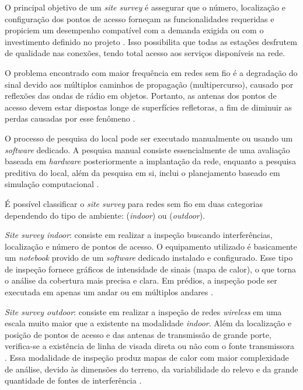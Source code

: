 O principal objetivo de um \textit{site survey} é assegurar que o número, localização e configuração dos pontos de acesso forneçam as funcionalidades requeridas e propiciem um desempenho compatível com a demanda exigida ou com o investimento definido no projeto \cite{pinheiro2004site}. Isso possibilita que todas as estações desfrutem de qualidade nas conexões, tendo total acesso aos serviços disponíveis na rede.

O problema encontrado com maior frequência em redes sem fio é a degradação do sinal devido aos múltiplos caminhos de propagação (multipercurso), causado por reflexões das ondas de rádio em objetos. Portanto, as antenas dos pontos de acesso devem estar dispostas longe de superfícies refletoras, a fim de diminuir as perdas causadas por esse fenômeno \cite{kar2018ieee}.

O processo de pesquisa do local pode ser executado manualmente ou usando um \textit{software} dedicado. A pesquisa manual consiste essencialmente de uma avaliação baseada em \textit{hardware} posteriormente a implantação da rede, enquanto a pesquisa preditiva do local, além da pesquisa em si, inclui o planejamento baseado em simulação computacional \cite{kar2018ieee}.

É possível classificar o \textit{site survey} para redes sem fio em duas categorias dependendo do tipo de ambiente: (\textit{indoor}) ou (\textit{outdoor}).

\textit{Site survey indoor}: consiste em realizar a inspeção buscando interferências, localização e número de pontos de acesso. O equipamento utilizado é basicamente um \textit{notebook} provido de um \textit{software} dedicado instalado e configurado. Esse tipo de inspeção fornece gráficos de intensidade de sinais (mapa de calor), o que torna o análise da cobertura mais precisa e clara. Em prédios, a inspeção pode ser executada em apenas um andar ou em múltiplos andares .

\textit{Site survey outdoor}: consiste em realizar a inspeção de redes \textit{wireless} em uma escala muito maior que a existente na modalidade \textit{indoor}. Além da localização e posição de pontos de acesso e das antenas de transmissão de grande porte, verifica-se a existência de linha de visada direta ou não com o fonte transmissora \cite{pinheiro2004site}. Essa modalidade de inspeção produz mapas de calor com maior complexidade de análise, devido às dimensões do terreno, da variabilidade do relevo e da grande quantidade de fontes de interferência .

